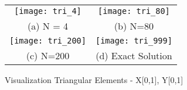 \documentclass[unicode,11pt,a4paper,twoside,numbers=endperiod,openany]{article}
\begin{document}
\begin{figure}
\caption{Visualization Triangular Elements - X[0,1], Y[0,1]}
\begin{tabular}{cc}
  \texttt{[image: tri\_4]} &   \texttt{[image: tri\_80]} \\
(a) N = 4 & (b) N=80 \\[6pt]
 \texttt{[image: tri\_200]} &   \texttt{[image: tri\_999]} \\
(c) N=200 & (d) Exact Solution \\[6pt]
\end{tabular}

\end{figure}
\end{document}
